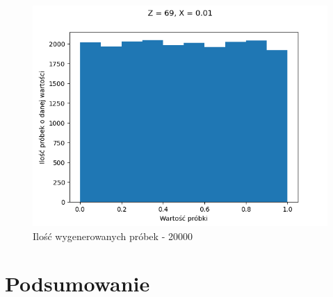 \documentclass[12pt,a4paper]{article}
\begin{document}
  \begin{figure}[H]
    \centering
    \includegraphics[height=0.25\textheight]{figures/Figure_13.png}
    \caption{Ilość wygenerowanych próbek - 20000}
    \label{fig:13}
  \end{figure}


\section{Podsumowanie}
\end{document}

